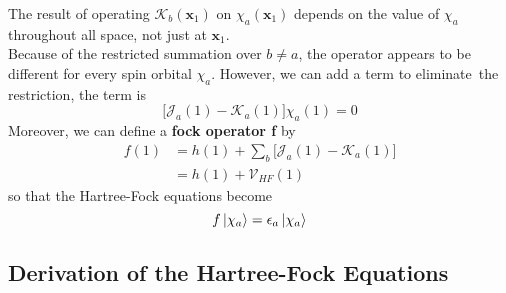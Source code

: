 \documentclass[11pt]{article}
\begin{document}
The result of operating $\mathcal{K}_b(\mathbf{x}_1)$ on $\chi_a(\mathbf{x}_1)$ depends on the value of $\chi_a$ throughout all space, not just at $\mathbf{x}_1$.\\
Because of the restricted summation over $b \neq a$, the operator appears to be different for every spin orbital $\chi_a$. However, we can add a term to eliminate\
the restriction, the term is
\begin{equation}
    \big[\mathcal{J}_a(1)-\mathcal{K}_a(1)\big]\chi_a(1)=0
\end{equation}
Moreover, we can define a \textbf{fock operator f} by
\begin{equation}
    \begin{split}
        f(1)&=h(1)+\sum_{b}\big[\mathcal{J}_a(1)-\mathcal{K}_a(1)\big]\\
        &=h(1)+\mathcal{V}_{HF}(1)
    \end{split}
\end{equation}
so that the Hartree-Fock equations become
\begin{equation}
    f\ket{\chi_a}=\epsilon_a\ket{\chi_a}
\end{equation}
\subsection{Derivation of the Hartree-Fock Equations}
\end{document}
